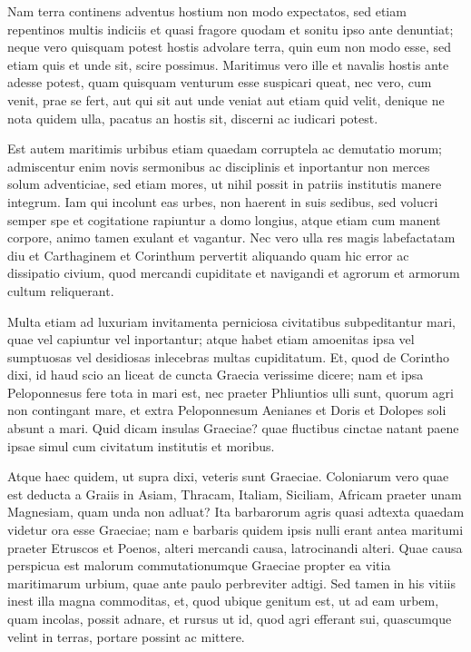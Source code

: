  Nam terra continens adventus hostium non modo expectatos, sed etiam repentinos multis indiciis et quasi fragore quodam et sonitu ipso ante denuntiat; neque vero quisquam potest hostis advolare terra, quin eum non modo esse, sed etiam quis et unde sit, scire possimus. Maritimus vero ille et navalis hostis ante adesse potest, quam quisquam venturum esse suspicari queat, nec vero, cum venit, prae se fert, aut qui sit aut unde veniat aut etiam quid velit, denique ne nota quidem ulla, pacatus an hostis sit, discerni ac iudicari potest.

 Est autem maritimis urbibus etiam quaedam corruptela ac demutatio morum; admiscentur enim novis sermonibus ac disciplinis et inportantur non merces solum adventiciae, sed etiam mores, ut nihil possit in patriis institutis manere integrum. Iam qui incolunt eas urbes, non haerent in suis sedibus, sed volucri semper spe et cogitatione rapiuntur a domo longius, atque etiam cum manent corpore, animo tamen exulant et vagantur. Nec vero ulla res magis labefactatam diu et Carthaginem et Corinthum pervertit aliquando quam hic error ac dissipatio civium, quod mercandi cupiditate et navigandi et agrorum et armorum cultum reliquerant.

 Multa etiam ad luxuriam invitamenta perniciosa civitatibus subpeditantur mari, quae vel capiuntur vel inportantur; atque habet etiam amoenitas ipsa vel sumptuosas vel desidiosas inlecebras multas cupiditatum. Et, quod de Corintho dixi, id haud scio an liceat de cuncta Graecia verissime dicere; nam et ipsa Peloponnesus fere tota in mari est, nec praeter Phliuntios ulli sunt, quorum agri non contingant mare, et extra Peloponnesum Aenianes et Doris et Dolopes soli absunt a mari. Quid dicam insulas Graeciae? quae fluctibus cinctae natant paene ipsae simul cum civitatum institutis et moribus.

 Atque haec quidem, ut supra dixi, veteris sunt Graeciae. Coloniarum vero quae est deducta a Graiis in Asiam, Thracam, Italiam, Siciliam, Africam praeter unam Magnesiam, quam unda non adluat? Ita barbarorum agris quasi adtexta quaedam videtur ora esse Graeciae; nam e barbaris quidem ipsis nulli erant antea maritumi praeter Etruscos et Poenos, alteri mercandi causa, latrocinandi alteri. Quae causa perspicua est malorum commutationumque Graeciae propter ea vitia maritimarum urbium, quae ante paulo perbreviter adtigi. Sed tamen in his vitiis inest illa magna commoditas, et, quod ubique genitum est, ut ad eam urbem, quam incolas, possit adnare, et rursus ut id, quod agri efferant sui, quascumque velint in terras, portare possint ac mittere.

